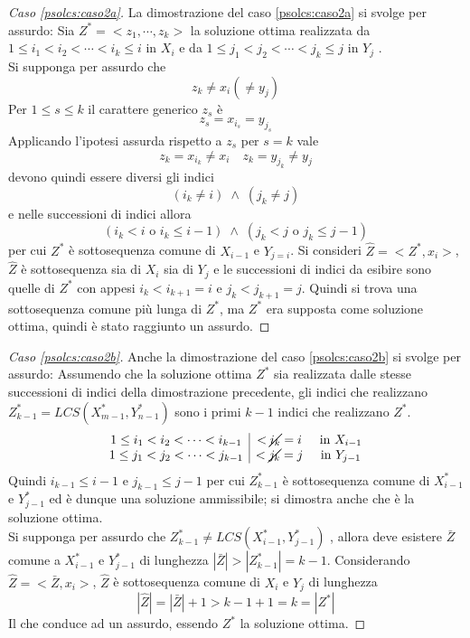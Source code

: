 \begin{proof}[Caso \ref{psolcs:caso2a}]
    La dimostrazione del caso \ref{psolcs:caso2a} si svolge per assurdo:
    Sia 
    $ Z^* = < z_1, \cdots, z_k > $
    la soluzione ottima realizzata da 
    $1 \leq i_1 < i_2 < \cdots < i_k \leq i $ in $X_i$
    e da
    $1 \leq j_1 < j_2 < \cdots < j_k \leq j $ in $Y_j$
    .\\
    Si supponga per assurdo che
    \[
        z_k \neq x_i ( \neq y_j)
    \]
    Per $1 \leq s \leq k$ il carattere generico $z_s$ è
    \[
        z_s = x_{i_s} = y_{j_s}
    \]
    Applicando l'ipotesi assurda rispetto a  $z_s$ per $s=k$ vale
    \[
        z_k = x_{i_k} \neq x_i \quad z_k = y_{j_k} \neq y_j
    \]
    devono quindi essere diversi gli indici
    \[
        (i_k \neq i) \; \wedge \; (j_k \neq j)
    \]
    e nelle successioni di indici allora
    \[
        (i_k<i \text{ o } i_k \leq i-1) 
        \; \wedge \;
        (j_k<j \text{ o } j_k \leq j-1)
    \]
    per cui $Z^*$ è sottosequenza comune di $X_{i-1}$ e $Y_{j=i}$.
    Si consideri $\hat{Z} = < Z^* , x_i >$, $\hat{Z}$ è sottosequenza sia di $X_i$ sia di $Y_j$
    e le successioni di indici da esibire sono quelle di $Z^*$ con appesi $i_k < i_{k+1} = i$ e $j_k < j_{k+1} = j$.
    Quindi si trova una sottosequenza comune più lunga di $Z^*$, ma $Z^*$ era supposta come soluzione ottima, quindi è stato raggiunto un assurdo.
\end{proof}

\begin{proof}[Caso \ref{psolcs:caso2b}]
    Anche la dimostrazione del caso \ref{psolcs:caso2b} si svolge per assurdo:
    Assumendo che la soluzione ottima $Z^*$ sia realizzata dalle stesse successioni di indici della dimostrazione precedente, gli indici che realizzano
    $Z_{k-1}^* = LCS(X_{m-1}^*, Y_{n-1}^*)$
    sono i primi $k-1$ indici che realizzano $Z^*$.
    \[
        \begin{array}{c|cc}
            1 \leq i_1 < i_2 < \cdots < i_{k-1} & < \cancel{i_k} = i  & \text{ in } X_{i-1}
            \\
            1 \leq j_1 < j_2 < \cdots < j_{k-1} & < \cancel{j_k} = j  & \text{ in } Y_{j-1}
        \end{array}
    \]
    Quindi $i_{k-1} \leq i-1$ e $j_{k-1} \leq j-1$
    per cui 
    $Z_{k-1}^* $ è sottosequenza comune di $X_{i-1}^* $ e $ Y_{j-1}^*$ ed è dunque una soluzione ammissibile; si dimostra anche che è la soluzione ottima.
    \\
    Si supponga per assurdo che
    $Z_{k-1}^* \neq LCS(X_{i-1}^*, Y_{j-1}^*)$
    , allora deve esistere $\bar{Z}$ comune a $X_{i-1}^* $ e $ Y_{j-1}^*$ di lunghezza
    $
    | \bar{Z} | > | Z_{k-1}^* | = k-1
    $.
    Considerando $\hat{Z} = < \bar{Z} , x_i > $, $\hat{Z}$ è sottosequenza comune di $X_i$ e $Y_j$ di lunghezza
    \[
        | \hat{Z} | = | \bar{Z} | + 1 > k -1 +1 = k = | Z^* |
    \]
    Il che conduce ad un assurdo, essendo $Z^*$ la soluzione ottima.
\end{proof}

